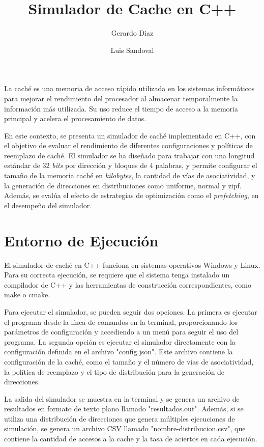 \documentclass[12pt]{article}
\title{Simulador de Cache en C++}
\author{Gerardo Diaz \and Luis Sandoval}
\begin{document}
\maketitle
%
La caché es una memoria de acceso rápido utilizada en los sistemas informáticos para mejorar el rendimiento del procesador al almacenar temporalmente la información más utilizada. Su uso reduce el tiempo de acceso a la memoria principal y acelera el procesamiento de datos.

En este contexto, se presenta un simulador de caché implementado en C++, con el objetivo de evaluar el rendimiento de diferentes configuraciones y políticas de reemplazo de caché. El simulador se ha diseñado para trabajar con una longitud estándar de 32 \textit{bits} por dirección y bloques de 4 palabras, y permite configurar el tamaño de la memoria caché en \textit{kilobytes}, la cantidad de vías de asociatividad, y la generación de direcciones en distribuciones como uniforme, normal y zipf. Además, se evalúa el efecto de estrategias de optimización como el \textit{prefetching}, en el desempeño del simulador.
%
\section*{Entorno de Ejecución}
\vspace{-5pt}
El simulador de caché en C++ funciona en sistemas operativos Windows y Linux. Para su correcta ejecución, se requiere que el sistema tenga instalado un compilador de C++ y las herramientas de construcción correspondientes, como make o cmake.

Para ejecutar el simulador, se pueden seguir dos opciones. La primera es ejecutar el programa desde la línea de comandos en la terminal, proporcionando los parámetros de configuración y accediendo a un menú para seguir el uso del programa. La segunda opción es ejecutar el simulador directamente con la configuración definida en el archivo "config.json". Este archivo contiene la configuración de la caché, como el tamaño y el número de vías de asociatividad, la política de reemplazo y el tipo de distribución para la generación de direcciones.

La salida del simulador se muestra en la terminal y se genera un archivo de resultados en formato de texto plano llamado "resultados.out". Además, si se utiliza una distribución de direcciones que genera múltiples ejecuciones de simulación, se genera un archivo CSV llamado "nombre-distribucion.csv", que contiene la cantidad de accesos a la cache y la tasa de aciertos en cada ejecución.
%
\end{document}
